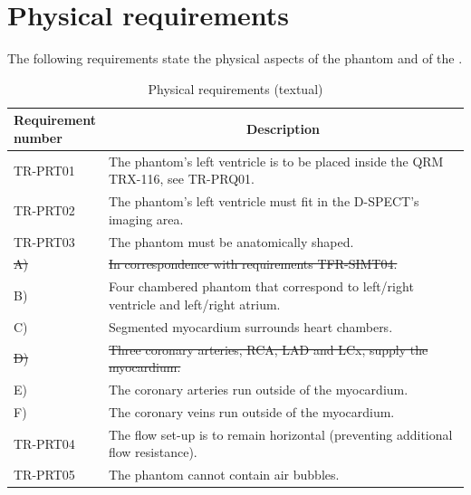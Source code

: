 \section{Physical requirements}
The following requirements state the physical aspects of the phantom and of the .

\begin{table}[H]
\caption{Physical requirements (textual)}
\label{tab:physrec_text}
\begin{tabular}{l|p{115mm}|}
	\makecell[l]{\textbf{Requirement} \\  \textbf{number}} & \multicolumn{1}{c}{\textbf{Description}} \\
	\hline
	TR-PRT01 			& The phantom's left ventricle is to be placed inside the QRM TRX-116, see TR-PRQ01. \\
	TR-PRT02 			& The phantom's left ventricle must fit in the D-SPECT's imaging area. \\
	TR-PRT03 			& The phantom must be anatomically shaped. \\
	\hspace{1.5cm} \sout{A)} 	& \sout{In correspondence with requirements TFR-SIMT04.} \\
	\hspace{1.5cm} B) 	& Four chambered phantom that correspond to left/right ventricle and left/right atrium. \\
	\hspace{1.5cm} C) 	& Segmented myocardium surrounds heart chambers. \\
	\hspace{1.5cm}\sout{D)}	& \sout{Three coronary arteries, RCA, LAD and LCx, supply the myocardium.} \\
	\hspace{1.5cm} E) 	& The coronary arteries run outside of the myocardium. \\
	\hspace{1.5cm} F) 	& The coronary veins run outside of the myocardium. \\
	TR-PRT04 			& The flow set-up is to remain horizontal (preventing additional flow resistance). \\
	TR-PRT05 			& The phantom cannot contain air bubbles. \\
	\cline{2-2}
\end{tabular}
\end{table}


